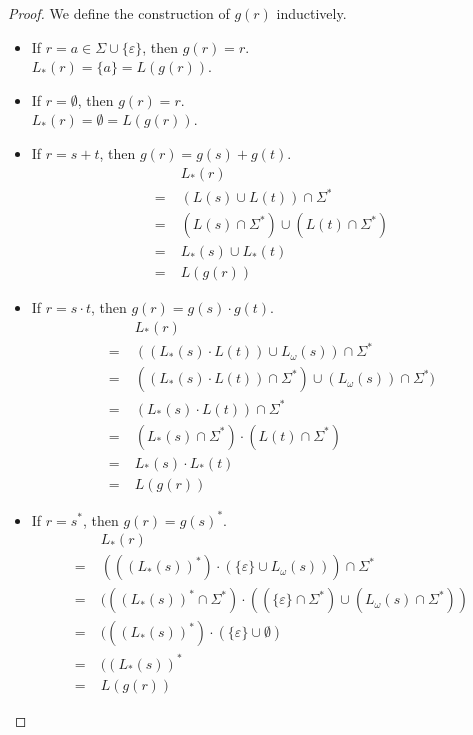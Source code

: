\begin{proof}
	We define the construction of $g(r)$ inductively.
	\begin{itemize}
		\item If $r = a \in \Sigma \cup \{\varepsilon\}$, then $g(r) = r$.\\
			$L_*(r) = \{a\} = L(g(r))$.
			
		\item If $r = \emptyset$, then $g(r) = r$. \\
			$L_*(r) = \emptyset = L(g(r))$.
		
		\item If $r = s + t$, then $g(r) = g(s) + g(t)$.
		\begin{align*}
			& L_*(r) \\
			=\;& (L(s) \cup L(t)) \cap \Sigma^* \\
			=\;& (L(s) \cap \Sigma^*) \cup (L(t) \cap \Sigma^*) \\ 
			=\;& L_*(s) \cup L_*(t) \\
			=\;& L(g(r))
		\end{align*}
		
		\item If $r = s \cdot t$, then $g(r) = g(s) \cdot g(t)$. \\
		\begin{align*}
			& L_*(r) \\
			=\;& ((L_*(s) \cdot L(t)) \cup L_\omega(s)) \cap \Sigma^* \\
			=\;& ((L_*(s) \cdot L(t)) \cap \Sigma^*) \cup (L_\omega(s)) \cap \Sigma^*) \\
			=\;& (L_*(s) \cdot L(t)) \cap \Sigma^* \\
			=\;& (L_*(s) \cap \Sigma^*) \cdot (L(t) \cap \Sigma^*) \\
			=\;& L_*(s) \cdot L_*(t) \\
			=\;& L(g(r))
		\end{align*}
		
		\item If $r = s^*$, then $g(r) = g(s)^*$. \\
		\begin{align*}
			& L_*(r) \\
			=\;& (((L_*(s))^*) \cdot (\{\varepsilon\} \cup L_\omega(s))) \cap \Sigma^* \\
			=\;& (((L_*(s))^* \cap \Sigma^*) \cdot ((\{\varepsilon\} \cap \Sigma^*) \cup (L_\omega(s) \cap \Sigma^*)) \\
			=\;& (((L_*(s))^*) \cdot (\{\varepsilon\} \cup \emptyset) \\
			=\;& ((L_*(s))^* \\
			=\;& L(g(r))
		\end{align*}
		

\end{itemize}
\end{proof}
